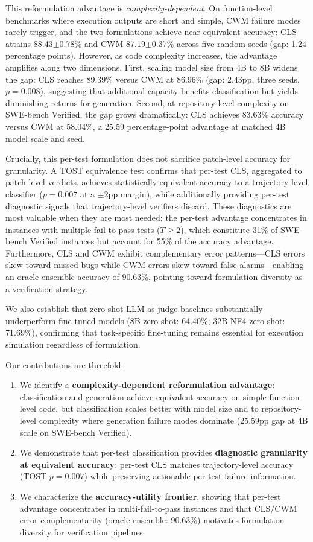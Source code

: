 This reformulation advantage is \emph{complexity-dependent}. On function-level benchmarks where execution outputs are short and simple, CWM failure modes rarely trigger, and the two formulations achieve near-equivalent accuracy: CLS attains 88.43$\pm$0.78\% and CWM 87.19$\pm$0.37\% across five random seeds (gap: 1.24 percentage points). However, as code complexity increases, the advantage amplifies along two dimensions. First, scaling model size from 4B to 8B widens the gap: CLS reaches 89.39\% versus CWM at 86.96\% (gap: 2.43pp, three seeds, $p = 0.008$), suggesting that additional capacity benefits classification but yields diminishing returns for generation. Second, at repository-level complexity on SWE-bench Verified, the gap grows dramatically: CLS achieves 83.63\% accuracy versus CWM at 58.04\%, a 25.59 percentage-point advantage at matched 4B model scale and seed.

Crucially, this per-test formulation does not sacrifice patch-level accuracy for granularity. A TOST equivalence test confirms that per-test CLS, aggregated to patch-level verdicts, achieves statistically equivalent accuracy to a trajectory-level classifier ($p = 0.007$ at a $\pm$2pp margin), while additionally providing per-test diagnostic signals that trajectory-level verifiers discard. These diagnostics are most valuable when they are most needed: the per-test advantage concentrates in instances with multiple fail-to-pass tests ($T \geq 2$), which constitute 31\% of SWE-bench Verified instances but account for 55\% of the accuracy advantage. Furthermore, CLS and CWM exhibit complementary error patterns---CLS errors skew toward missed bugs while CWM errors skew toward false alarms---enabling an oracle ensemble accuracy of 90.63\%, pointing toward formulation diversity as a verification strategy.

We also establish that zero-shot LLM-as-judge baselines substantially underperform fine-tuned models (8B zero-shot: 64.40\%; 32B NF4 zero-shot: 71.69\%), confirming that task-specific fine-tuning remains essential for execution simulation regardless of formulation.

Our contributions are threefold:
\begin{enumerate}
    \item We identify a \textbf{complexity-dependent reformulation advantage}: classification and generation achieve equivalent accuracy on simple function-level code, but classification scales better with model size and to repository-level complexity where generation failure modes dominate (25.59pp gap at 4B scale on SWE-bench Verified).
    \item We demonstrate that per-test classification provides \textbf{diagnostic granularity at equivalent accuracy}: per-test CLS matches trajectory-level accuracy (TOST $p = 0.007$) while preserving actionable per-test failure information.
    \item We characterize the \textbf{accuracy-utility frontier}, showing that per-test advantage concentrates in multi-fail-to-pass instances and that CLS/CWM error complementarity (oracle ensemble: 90.63\%) motivates formulation diversity for verification pipelines.
\end{enumerate}
